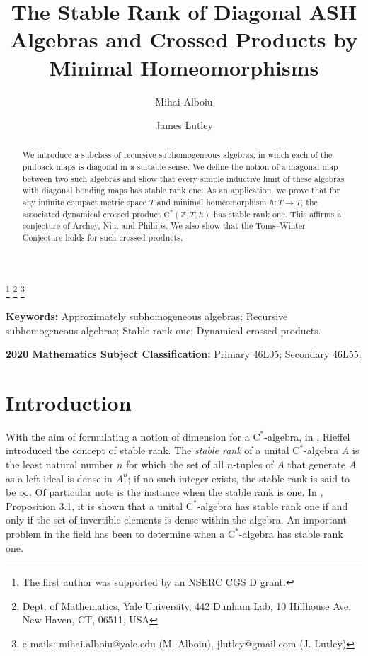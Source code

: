 \documentclass[12pt]{amsart}
\numberwithin{equation}{section}
\theoremstyle{definition}
\theoremstyle{remark}
\begin{document}
\title[The Stable Rank of Diagonal ASH Algebras]{The Stable Rank of Diagonal ASH Algebras and Crossed Products by Minimal Homeomorphisms}


\author{Mihai Alboiu}
\thanks{The first author was supported by an NSERC CGS D grant.}
\thanks{Dept. of Mathematics, Yale University, 
	442 Dunham Lab, 10 Hillhouse Ave, New Haven, CT, 06511, USA} 
\thanks{e-mails: mihai.alboiu@yale.edu (M. Alboiu), jlutley@gmail.com (J. Lutley)}
\address{Department of Mathematics, Yale University, 
442 Dunham Lab, 10 Hillhouse Ave, New Haven, CT, 06511, USA} 

\author{James Lutley}




\begin{abstract} We introduce a subclass of recursive subhomogeneous algebras, in which each of the pullback maps is diagonal in a suitable sense. We define the notion of a diagonal map between two such algebras and show that every simple inductive limit of these algebras with diagonal bonding maps has stable rank one. As an application, we prove that for any infinite compact metric space $T$ and minimal homeomorphism $h\colon T\to T$, the associated dynamical crossed product $\mathrm{C^*}(\mathbb{Z},T,h)$ has stable rank one. This affirms a conjecture of Archey, Niu, and Phillips. We also show that the Toms--Winter Conjecture holds for such crossed products.
\end{abstract}

\maketitle

\textbf{Keywords:} Approximately subhomogeneous algebras; Recursive subhomogeneous algebras; Stable rank one; Dynamical crossed products.

\textbf{2020 Mathematics Subject Classification:} Primary 46L05; Secondary 46L55.

\section{Introduction} 

With the aim of formulating a notion of dimension for a $\mathrm{C}^{*}$-algebra, in \cite{rie}, Rieffel  introduced the concept of stable rank. The \textit{stable rank} of a unital $\mathrm{C}^{*}$-algebra $A$ is the least natural number $n$ for which the set of all $n$-tuples of $A$ that generate $A$ as a left ideal is dense in $A^{n}$; if no such integer exists, the stable rank is said to be $\infty$. Of particular note is the instance when the stable rank is one. In \cite{rie}, Proposition 3.1, it is shown that a unital $\mathrm{C}^{*}$-algebra has stable rank one if and only if the set of invertible elements is dense within the algebra. An important problem in the field has been to determine when a $\mathrm{C}^{*}$-algebra has stable rank one. 
\end{document}
